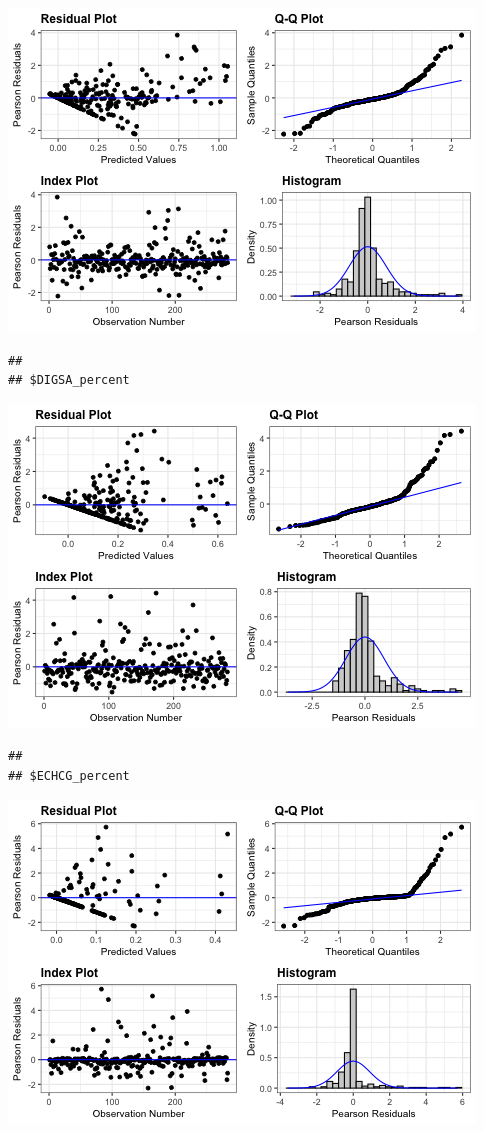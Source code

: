 \documentclass[
]{article}
\begin{document}
\includegraphics{Individual-sp-difference_files/figure-latex/unnamed-chunk-15-2.png}

\begin{verbatim}
## 
## $DIGSA_percent
\end{verbatim}

\includegraphics{Individual-sp-difference_files/figure-latex/unnamed-chunk-15-3.png}

\begin{verbatim}
## 
## $ECHCG_percent
\end{verbatim}

\includegraphics{Individual-sp-difference_files/figure-latex/unnamed-chunk-15-4.png}
\end{document}
